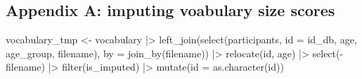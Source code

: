 \documentclass[
  letterpaper,
  DIV=11,
  numbers=noendperiod]{scrartcl}
\newenvironment{Shaded}{\begin{snugshade}}{\end{snugshade}}
\newcommand{\AttributeTok}[1]{\textcolor[rgb]{0.40,0.45,0.13}{#1}}
\newcommand{\FunctionTok}[1]{\textcolor[rgb]{0.28,0.35,0.67}{#1}}
\newcommand{\NormalTok}[1]{\textcolor[rgb]{0.00,0.23,0.31}{#1}}
\newcommand{\OtherTok}[1]{\textcolor[rgb]{0.00,0.23,0.31}{#1}}
\newcommand{\SpecialCharTok}[1]{\textcolor[rgb]{0.37,0.37,0.37}{#1}}
\begin{document}
\hypertarget{appendix-a-imputing-voabulary-size-scores}{%
\subsection{Appendix A: imputing voabulary size
scores}\label{appendix-a-imputing-voabulary-size-scores}}

\begin{Shaded}
\begin{Highlighting}[]
\NormalTok{vocabulary\_tmp }\OtherTok{\textless{}{-}}\NormalTok{ vocabulary }\SpecialCharTok{|\textgreater{}} 
    \FunctionTok{left\_join}\NormalTok{(}\FunctionTok{select}\NormalTok{(participants, }\AttributeTok{id =}\NormalTok{ id\_db, age, age\_group, filename),}
              \AttributeTok{by =} \FunctionTok{join\_by}\NormalTok{(filename)) }\SpecialCharTok{|\textgreater{}} 
    \FunctionTok{relocate}\NormalTok{(id, age) }\SpecialCharTok{|\textgreater{}} 
    \FunctionTok{select}\NormalTok{(}\SpecialCharTok{{-}}\NormalTok{filename) }\SpecialCharTok{|\textgreater{}} 
    \FunctionTok{filter}\NormalTok{(is\_imputed) }\SpecialCharTok{|\textgreater{}} 
    \FunctionTok{mutate}\NormalTok{(}\AttributeTok{id =} \FunctionTok{as.character}\NormalTok{(id))}


\end{Highlighting}
\end{Shaded}
\end{document}
